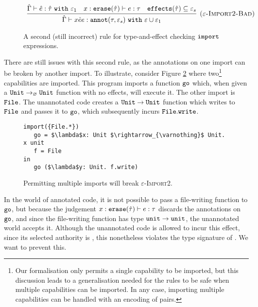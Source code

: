 \begin{figure}
\vspace*{-5mm}
\[
\begin{array}{c}
\infer[\textsc{($\varepsilon$-Import2-Bad)}]
	{ \hat \Gamma \vdash {x}{\hat e}{e}: \kwa{annot}(\tau, \varepsilon_s)~\kw{with} \varepsilon \cup \varepsilon_1 }
	{ \hat \Gamma \vdash \hat e: \hat \tau~\kw{with} \varepsilon_1 & x: \kwa{erase}(\hat \tau) \vdash e: \tau & \kwa{effects}(\hat \tau) \subseteq \varepsilon_s}

\end{array}
\]
\vspace*{-5mm}
\caption{A second (still incorrect) rule for type-and-effect checking $\mathtt{import}$ expressions.}
\vspace*{-5mm}
\label{fig:import_rule_2}
\end{figure}

There are still issues with this second rule, as the annotations on one import
can be broken by another import. To illustrate, consider Figure
\ref{fig:rule_import2_counterexample}
where two\footnote{Our formalisation only permits a single capability
  to be imported, but this discussion leads to a generalisation needed
  for the rules to be safe when multiple capabilities can be imported.
  In any case, importing multiple capabilities can be handled with an
  encoding of pairs.} capabilities are imported. This program imports
a function $\mathtt{go}$ which, when given a
$\mathtt{Unit} \rightarrow_{\varnothing} \mathtt{Unit}$ function with no effects, will
execute it. The other import is $\mathtt{File}$. The unannotated code
creates a $\mathtt{Unit} \rightarrow \mathtt{Unit}$ function which writes to
$\mathtt{File}$ and passes it to $\mathtt{go}$, which subsequently incurs
$\mathtt{File.write}$.

\begin{figure}[h]
\vspace*{-5mm}
\begin{lstlisting}
import({File.*})
   go = $\lambda$x: Unit $\rightarrow_{\varnothing}$ Unit. x unit
   f = File
in
   go ($\lambda$y: Unit. f.write)
\end{lstlisting}
\vspace*{-5mm}
\caption{Permitting multiple imports will break \textsc{$\varepsilon$-Import2}.}
\vspace*{-5mm}
\label{fig:rule_import2_counterexample}
\end{figure}

In the world of annotated code, it is not possible to pass a
file-writing function to $\mathtt{go}$, but because the judgement
$x: \mathtt{erase}(\hat \tau) \vdash e: \tau$ discards the annotations on
$\mathtt{go}$, and since the file-writing function has type
$\mathtt{unit} \rightarrow \mathtt{unit}$, the unannotated world accepts it.
Although the unannotated code is allowed to incur this effect, since
its selected authority is , this nonetheless violates the type signature of . We want to prevent this.

